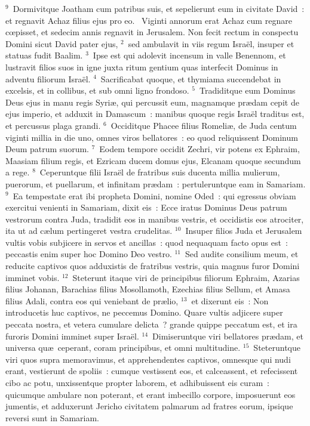 ${}^{9}$~Dormivitque Joatham cum patribus suis, et sepelierunt eum in civitate David~: et regnavit Achaz filius ejus pro eo.
~\lettrine[lines=10,image=true,loversize=0.05,lraise=-0.03]{V}{}iginti annorum erat Achaz cum regnare cœpisset, et sedecim annis regnavit in Jerusalem. Non fecit rectum in conspectu Domini sicut David pater ejus,
${}^{2}$~sed ambulavit in viis regum Isra\"el, insuper et statuas fudit Baalim.
${}^{3}$~Ipse est qui adolevit incensum in valle Benennom, et lustravit filios suos in igne juxta ritum gentium quas interfecit Dominus in adventu filiorum Isra\"el.
${}^{4}$~Sacrificabat quoque, et thymiama succendebat in excelsis, et in collibus, et sub omni ligno frondoso.
${}^{5}$~Tradiditque eum Dominus Deus ejus in manu regis Syri\ae , qui percussit eum, magnamque pr\ae dam cepit de ejus imperio, et adduxit in Damascum~: manibus quoque regis Isra\"el traditus est, et percussus plaga grandi.
${}^{6}$~Occiditque Phacee filius Romeli\ae , de Juda centum viginti millia in die uno, omnes viros bellatores~: eo quod reliquissent Dominum Deum patrum suorum.
${}^{7}$~Eodem tempore occidit Zechri, vir potens ex Ephraim, Maasiam filium regis, et Ezricam ducem domus ejus, Elcanam quoque secundum a rege.
${}^{8}$~Ceperuntque filii Isra\"el de fratribus suis ducenta millia mulierum, puerorum, et puellarum, et infinitam pr\ae dam~: pertuleruntque eam in Samariam.
${}^{9}$~Ea tempestate erat ibi propheta Domini, nomine Oded~: qui egressus obviam exercitui venienti in Samariam, dixit eis~: Ecce iratus Dominus Deus patrum vestrorum contra Juda, tradidit eos in manibus vestris, et occidistis eos atrociter, ita ut ad c\ae lum pertingeret vestra crudelitas.
${}^{10}$~Insuper filios Juda et Jerusalem vultis vobis subjicere in servos et ancillas~: quod nequaquam facto opus est~: peccastis enim super hoc Domino Deo vestro.
${}^{11}$~Sed audite consilium meum, et reducite captivos quos adduxistis de fratribus vestris, quia magnus furor Domini imminet vobis.
${}^{12}$~Steterunt itaque viri de principibus filiorum Ephraim, Azarias filius Johanan, Barachias filius Mosollamoth, Ezechias filius Sellum, et Amasa filius Adali, contra eos qui veniebant de pr\ae lio,
${}^{13}$~et dixerunt eis~: Non introducetis huc captivos, ne peccemus Domino. Quare vultis adjicere super peccata nostra, et vetera cumulare delicta~? grande quippe peccatum est, et ira furoris Domini imminet super Isra\"el.
${}^{14}$~Dimiseruntque viri bellatores pr\ae dam, et universa qu\ae\ ceperant, coram principibus, et omni multitudine.
${}^{15}$~Steteruntque viri quos supra memoravimus, et apprehendentes captivos, omnesque qui nudi erant, vestierunt de spoliis~: cumque vestissent eos, et calceassent, et refecissent cibo ac potu, unxissentque propter laborem, et adhibuissent eis curam~: quicumque ambulare non poterant, et erant imbecillo corpore, imposuerunt eos jumentis, et adduxerunt Jericho civitatem palmarum ad fratres eorum, ipsique reversi sunt in Samariam.



